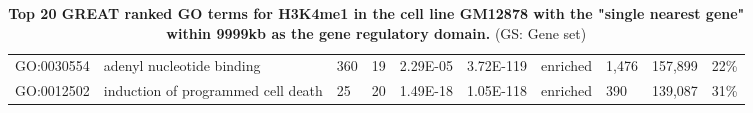 \begin{sidewaystable}[!ht]
\begin{tabular}{lp{2cm}p{1cm}p{1cm}p{1.25cm}p{1.25cm}p{1cm}p{1.25cm}p{1.25cm}p{1.25cm}}
GO:0030554 & adenyl nucleotide binding               & 360               & 19         & 2.29E-05             & 3.72E-119     & enriched & 1,476       & 157,899       & 22\%                 \\
GO:0012502 & induction of programmed cell death      & 25                & 20         & 1.49E-18             & 1.05E-118     & enriched & 390         & 139,087       & 31\%
\end{tabular}
\normalsize
\caption[Top 20 GREAT ranked GO terms for H3K4me1 in the cell line GM12878 with the "single nearest gene" within 9999kb as the gene regulatory domain.]
{
\textbf{Top 20 GREAT ranked GO terms for H3K4me1 in the cell line GM12878 with the "single nearest gene" within 9999kb as the gene regulatory domain.}
(GS: Gene set)
}
\label{chap2:table:8}
\end{sidewaystable}

\newpage

